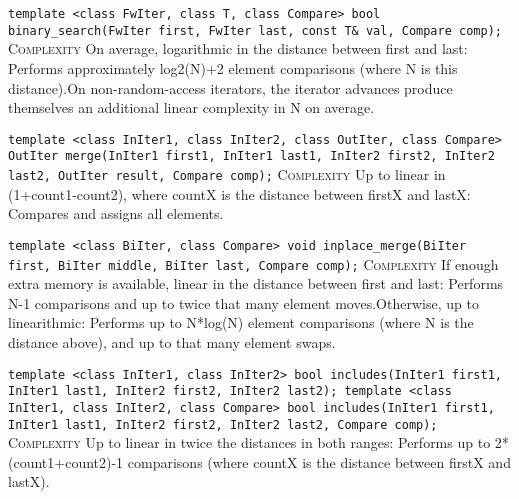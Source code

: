 \noindent{}\hspace*{0.25em}\lstinline[basicstyle=\ttfamily\color{corange}]{template <class FwIter, class T, class Compare> bool binary_search(FwIter first, FwIter last, const T& val, Compare comp);} \textsc{Complexity} On average, logarithmic in the distance between first and last: Performs approximately log2(N)+2 element comparisons (where N is this distance).On non-random-access iterators, the iterator advances produce themselves an additional linear complexity in N on average.\\\vspace{-0.6em}

\noindent{}\hspace*{0.25em}\lstinline[basicstyle=\ttfamily\color{corange}]{template <class InIter1, class InIter2, class OutIter, class Compare> OutIter merge(InIter1 first1, InIter1 last1, InIter2 first2, InIter2 last2, OutIter result, Compare comp);} \textsc{Complexity} Up to linear in (1+count1-count2), where countX is the distance between firstX and lastX: Compares and assigns all elements.\\\vspace{-0.6em}

\noindent{}\hspace*{0.25em}\lstinline[basicstyle=\ttfamily\color{cred}]{template <class BiIter, class Compare> void inplace_merge(BiIter first, BiIter middle, BiIter last, Compare comp);} \textsc{Complexity} If enough extra memory is available, linear in the distance between first and last: Performs N-1 comparisons and up to twice that many element moves.Otherwise, up to linearithmic: Performs up to N*log(N) element comparisons (where N is the distance above), and up to that many element swaps.\\\vspace{-0.6em}

\noindent{}\hspace*{0.25em}\lstinline[basicstyle=\ttfamily\color{corange}]{template <class InIter1, class InIter2> bool includes(InIter1 first1, InIter1 last1, InIter2 first2, InIter2 last2); template <class InIter1, class InIter2, class Compare> bool includes(InIter1 first1, InIter1 last1, InIter2 first2, InIter2 last2, Compare comp);} \textsc{Complexity} Up to linear in twice the distances in both ranges: Performs up to 2*(count1+count2)-1 comparisons (where countX is the distance between firstX and lastX).\\\vspace{-0.6em}

